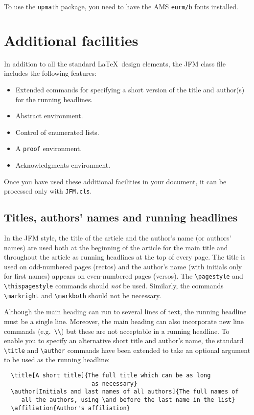 \documentclass{jfm}
\newcommand\eg{e.g.\ }
\begin{document}
To use the \verb"upmath" package, you need to have the AMS \verb"eurm/b"
fonts installed.

\section{Additional facilities}

In addition to all the standard \LaTeX\ design elements, the JFM class file
includes the following features:
\begin{itemize}
  \item Extended commands for specifying a short version
        of the title and author(s) for the running
        headlines.
  \item Abstract environment.
  \item Control of enumerated lists.
  \item A \verb"proof" environment.
  \item Acknowledgments environment.
\end{itemize}
Once you have used these additional facilities in your document,
it can be processed only with \verb"JFM.cls".

\subsection{Titles, authors' names and running headlines}

In the JFM style, the title of the article and the author's name (or authors'
names) are used both at the beginning of the article for the main title and
throughout the article as running headlines at the top of every page.
The title is used on odd-numbered pages (rectos) and the author's name
(with initials only for first names) appears on even-numbered pages
(versos). The \verb"\pagestyle" and \verb"\thispagestyle" commands should
\emph{not} be used.  Similarly, the commands \verb"\markright" and
\verb"\markboth" should not be necessary.

Although the main heading can run to several lines of text,
the running headline must be a single line.
Moreover, the main heading can also incorporate new line commands
(\eg \verb"\\") but these are not acceptable in a running headline.
To enable you to specify an alternative short title and author's name, the
standard \verb"\title" and \verb"\author" commands have been extended to take
an optional argument to be used as the running headline:
%
\begin{verbatim}
  \title[A short title]{The full title which can be as long
                         as necessary}
  \author[Initials and last names of all authors]{The full names of
     all the authors, using \and before the last name in the list}
  \affiliation{Author's affiliation}
\end{verbatim}
\end{document}
